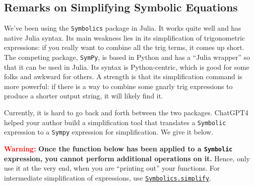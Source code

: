  





\subsection{Remarks on Simplifying Symbolic Equations}

We've been using the \texttt{Symbolics} package in Julia. It works quite well and has native Julia syntax. Its main weakness lies in its simplification of trigonometric expressions: if you really want to combine all the trig terms, it comes up short. The competing package, \texttt{SymPy}, is based in Python and has a ``Julia wrapper'' so that it can be used in Julia. Its syntax is Python-centric, which is good for some folks and awkward for others. A strength is that its simplification command is more powerful: if there is a way to combine some gnarly trig expressions to produce a shorter output string, it will likely find it.

Currently, it is hard to go back and forth between the two packages. ChatGPT4 helped your author build a simplification tool that translates a \texttt{Symbolic} expression to a \texttt{Sympy} expression for simplification. We give it below.

\bigskip

\textcolor{red}{\bf \Large Warning:} \textbf{Once the function below has been applied to a \texttt{Symbolic} expression, you cannot perform additional operations on it.} Hence, only use it at the very end, when you are ``printing out'' your functions.  For intermediate simplification of expressions, use \href{https://symbolics.juliasymbolics.org/stable/manual/expression_manipulation/#SymbolicUtils.simplify:~:text=SymbolicUtils.simplify,Function}{\texttt{Symbolics.simplify}}. 

